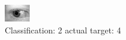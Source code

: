 \begin{figure}[h!]
\begin{center}
\includegraphics[width=0.60\columnwidth]{figures/ID849_class_2_target_4.png}
\end{center}
\caption{ Classification: 2 actual target: 4}
\label{fig:ID849_class_2_target_4}
\end{figure}
